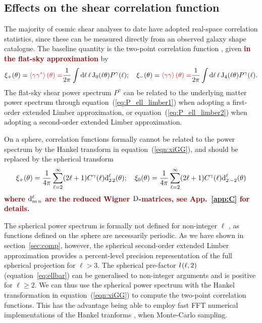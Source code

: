 \documentclass[fleqn,usenatbib]{mnras} %
\newcommand{\ellbar}{\hbox{\it \l}\,}
\newcommand{\forref}[1]{{\bf\textcolor{darkred}{#1}}}
\begin{document}
\subsection{Effects on the shear correlation function}
\label{sec:comp_xi}

The majority of cosmic shear analyses to date have adopted real-space
correlation statistics, since these can be measured directly from an observed
galaxy shape catalogue. The baseline quantity is the two-point correlation
function \citep{1991ApJ...370....1M, 1992ApJ...388..272K, BS01}, given \forref{in the flat-sky approximation} by
%
\begin{align}
  \xi_+(\theta) 
  = \forref{\left\langle \gamma \gamma^\ast \right\rangle(\theta) =} \frac 1 {2\pi} \int {\rm d} \ell \, \ell \, {\rm J}_0(\ell
   \theta)
  P^\gamma(\ell);
  \quad
   \xi_-(\theta)
  = \forref{\left\langle \gamma \gamma \right\rangle(\theta) =} \frac 1 {2\pi} \int
   {\rm d} \ell \, \ell \, {\rm J}_4(\ell \theta)
  P^\gamma(\ell).
   \label{eqn:xiGG}
\end{align}
%
The flat-sky shear power spectrum $P^\gamma$ can be related to the underlying
matter power spectrum through equation~(\ref{eq:P_ell_limber1}) when adopting a
first-order extended Limber approximation, or equation~(\ref{eq:P_ell_limber2})
when adopting a second-order extended Limber approximation.

On a sphere, correlation functions formally cannot be related to the power
spectrum by the Hankel transform in equation~(\ref{eqn:xiGG}), and should
be replaced by the spherical transform \forref{\citep{1999IJMPD...8...61N,2004MNRAS.350..914C}}
%
\forref{
\begin{equation}
 \xi_+(\theta) 
  =  \frac 1{4\pi} \sum\limits_{\ell=2}^\infty (2 \ell + 1) C^\gamma(\ell) {\rm d}^\ell_{2\,2}(\theta); \quad 
 \xi_0(\theta) 
  =  \frac 1{4\pi} \sum\limits_{\ell=2}^\infty (2 \ell + 1) C^\gamma(\ell) {\rm d}^\ell_{2\,-2}(\theta)
  \label{eq:xi_wigner}
\end{equation}
}
%
\forref{where ${\rm d}^\ell_{m\,n}$ are the reduced Wigner ${\rm D}$-matrices, see App.~\ref{app:C} for details.}

The spherical power spectrum is formally not defined for non-integer $\ell$
\citep[see][for alternative spherical-sky formulae for the two-point
correlation function]{2005PhRvD..72b3516C}, as functions defined on the
sphere are necessarily periodic.
As we have shown in section~\ref{sec:comp}, however, the spherical second-order
extended Limber approximation provides a percent-level precision representation
of the full spherical projection for $\ell > 3$.
The spherical pre-factor $\ellbar(\ell, 2)$ (equation~\ref{eq:ellbar}) can be
generalised to non-integer arguments and is positive for $\ell \ge 2$. We can
thus use the spherical power spectrum with
the Hankel transformation in equation~(\ref{eqn:xiGG}) to compute the two-point correlation
functions. This has the advantage being able to employ fast FFT numerical implementations of
the Hankel tranforms \citep{fftlog}, when Monte-Carlo sampling.
\end{document}
